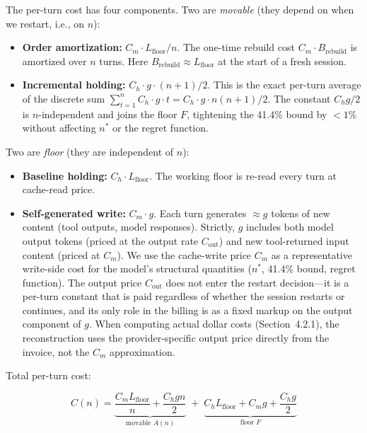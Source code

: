 \documentclass[11pt]{article}
\theoremstyle{definition}
\theoremstyle{remark}
\begin{document}
The per-turn cost has four components. Two are \emph{movable} (they depend on when we restart, i.e., on $n$):

\begin{itemize}[leftmargin=*,itemsep=0pt,topsep=0pt]
\item \textbf{Order amortization:} $C_m \cdot L_{\text{floor}} / n$. The one-time rebuild cost $C_m \cdot B_{\text{rebuild}}$ is amortized over $n$ turns. Here $B_{\text{rebuild}} \approx L_{\text{floor}}$ at the start of a fresh session.
\item \textbf{Incremental holding:} $C_h \cdot g \cdot (n+1) / 2$. This is the exact per-turn average of the discrete sum $\sum_{t=1}^{n} C_h \cdot g \cdot t = C_h \cdot g \cdot n(n+1)/2$. The constant $C_h g/2$ is $n$-independent and joins the floor $F$, tightening the 41.4\% bound by $<1\%$ without affecting $n^*$ or the regret function.
\end{itemize}

Two are \emph{floor} (they are independent of $n$):

\begin{itemize}[leftmargin=*,itemsep=0pt,topsep=0pt]
\item \textbf{Baseline holding:} $C_h \cdot L_{\text{floor}}$. The working floor is re-read every turn at cache-read price.
\item \textbf{Self-generated write:} $C_m \cdot g$. Each turn generates $\approx g$ tokens of new content (tool outputs, model responses). Strictly, $g$ includes both model output tokens (priced at the output rate $C_{\text{out}}$) and new tool-returned input content (priced at $C_m$). We use the cache-write price $C_m$ as a representative write-side cost for the model's structural quantities ($n^*$, 41.4\% bound, regret function). The output price $C_{\text{out}}$ does not enter the restart decision---it is a per-turn constant that is paid regardless of whether the session restarts or continues, and its only role in the billing is as a fixed markup on the output component of $g$. When computing actual dollar costs (Section~4.2.1), the reconstruction uses the provider-specific output price directly from the invoice, not the $C_m$ approximation.
\end{itemize}

Total per-turn cost:

\begin{equation}
C(n) = \underbrace{\frac{C_m L_{\text{floor}}}{n} + \frac{C_h g n}{2}}_{\text{movable } A(n)} \;+\; \underbrace{C_h L_{\text{floor}} + C_m g + \frac{C_h g}{2}}_{\text{floor } F}
\label{eq:cost}
\end{equation}
\end{document}
